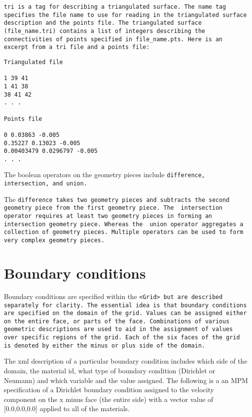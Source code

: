 \tt tri \normalfont is a tag for describing a triangulated surface.
The name tag specifies the file name to use for reading in the
triangulated surface description and the points file.  The
triangulated surface (file\_name.tri) contains a list of integers
describing the connectivities of points specified in file\_name.pts.
Here is an excerpt from a tri file and a points file:


\begin{Verbatim}[fontsize=\footnotesize]
Triangulated file

1 39 41
1 41 38
38 41 42
. . .

Points file

0 0.03863 -0.005
0.35227 0.13023 -0.005
0.00403479 0.0296797 -0.005
. . .

\end{Verbatim}

The boolean operators on the geometry pieces include \tt difference,
intersection, \normalfont and \tt union.\normalfont

The \tt difference \normalfont takes two geometry pieces and subtracts
the second geometry piece from the first geometry piece.  The \tt
intersection \normalfont operator requires at least two geometry
pieces in forming an intersection geometry piece.  Whereas the \tt
union \normalfont operator aggregates a collection of geometry pieces.
Multiple operators can be used to form very complex geometry pieces.


\section{Boundary conditions}

Boundary conditions are specified within the \tt <Grid> \normalfont
but are described separately for clarity.  The essential idea is that
boundary conditions are specified on the domain of the grid.  Values
can be assigned either on the entire face, or parts of the face.
Combinations of various geometric descriptions are used to aid in the
assignment of values over specific regions of the grid.  Each of the
six faces of the grid is denoted by either the minus or plus side of
the domain.

The xml description of a particular boundary condition includes which
side of the domain, the material id, what type of boundary condition
(Dirichlet or Neumann) and which variable and the value assigned.  The
following is a an MPM specification of a Dirichlet boundary condition
assigned to the velocity component on the x minus face (the entire
side) with a vector value of [0.0,0.0,0.0] applied to all of the materials.

